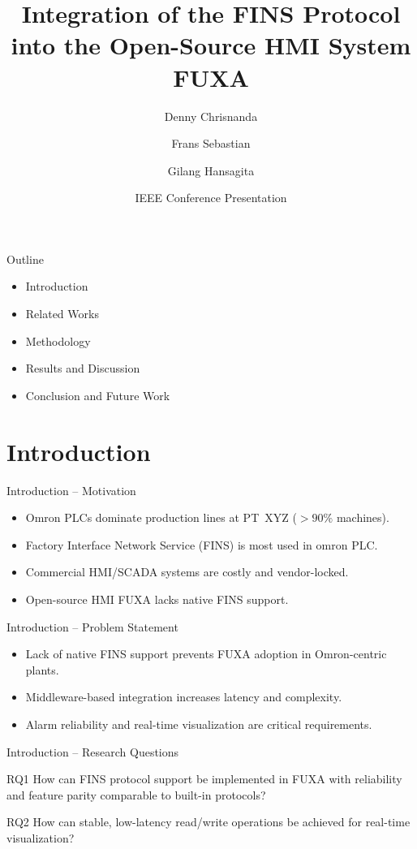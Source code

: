 \documentclass[aspectratio=169]{beamer}
\title[FINS Integration in FUXA]%
{Integration of the FINS Protocol into the Open-Source HMI System FUXA}
\author[D. Chrisnanda \and F. Sebastian \and G. Hansagita]%
{Denny Chrisnanda \and Frans Sebastian \and Gilang Hansagita}
\institute[Binus University]%
{Bina Nusantara University}
\date{IEEE Conference Presentation}
\begin{document}
\begin{frame}
  \titlepage
\end{frame}

\begin{frame}{Outline}
\begin{itemize}
  \item Introduction
  \item Related Works
  \item Methodology
  \item Results and Discussion
  \item Conclusion and Future Work
\end{itemize}
\end{frame}

\section{Introduction}

\begin{frame}{Introduction -- Motivation}
\begin{itemize}
  \item Omron PLCs dominate production lines at PT~XYZ ($>90\%$ machines).
  \item Factory Interface Network Service (FINS) is most used in omron PLC.
  \item Commercial HMI/SCADA systems are costly and vendor-locked.
  \item Open-source HMI FUXA lacks native FINS support.
\end{itemize}
\end{frame}

\begin{frame}{Introduction -- Problem Statement}
\begin{itemize}
  \item Lack of native FINS support prevents FUXA adoption in Omron-centric plants.
  \item Middleware-based integration increases latency and complexity.
  \item Alarm reliability and real-time visualization are critical requirements.
\end{itemize}
\end{frame}

\begin{frame}{Introduction -- Research Questions}
\begin{block}{RQ1}
How can FINS protocol support be implemented in FUXA with reliability and feature parity comparable to built-in protocols?
\end{block}

\begin{block}{RQ2}
How can stable, low-latency read/write operations be achieved for real-time visualization?
\end{block}
\end{frame}
\end{document}
